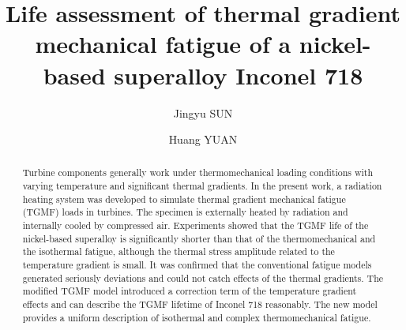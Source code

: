 \documentclass[preprint,5p,twocolumn,10pt,sort&compress]{elsarticle}
\begin{document}


\renewcommand\figureautorefname{Fig.}


\begin{frontmatter}



\title{Life assessment of thermal gradient mechanical fatigue of a nickel-based superalloy Inconel 718}


\author{Jingyu SUN}
\author{Huang YUAN}

\address{School of Aerospace Engineering, Tsinghua University, Beijing, China}

\begin{abstract}
Turbine components generally work under thermomechanical loading conditions with varying temperature and significant thermal gradients. In the present work, a radiation heating system was developed to simulate thermal gradient mechanical fatigue (TGMF) loads in turbines. The specimen is externally heated by radiation and internally cooled by compressed air. Experiments showed that the TGMF life of the nickel-based superalloy is significantly shorter than that of the thermomechanical and the isothermal fatigue, although the thermal stress amplitude related to the temperature gradient is small. It was confirmed that the conventional fatigue models generated seriously deviations and could not catch effects of the thermal gradients. The modified TGMF model introduced a correction term of the temperature gradient effects and can describe the TGMF lifetime of Inconel 718 reasonably. The new model provides a uniform description of isothermal and complex thermomechanical fatigue. 
\end{abstract}


\end{frontmatter}
\end{document}

